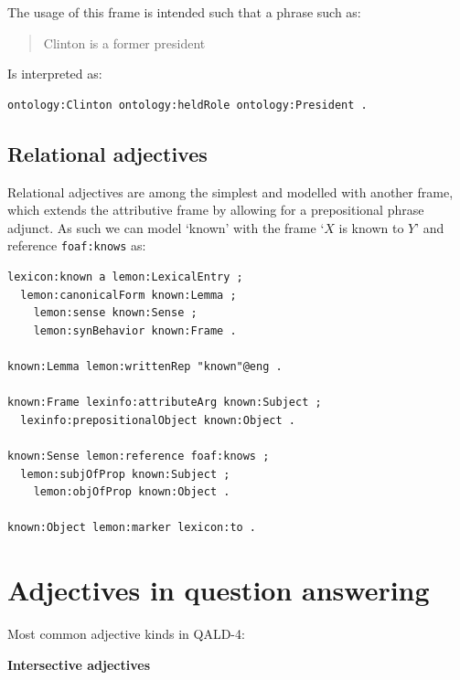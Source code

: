 \documentclass[11pt]{article}
\begin{document}
The usage of this frame is intended such that a phrase such as:

\begin{quote}
Clinton is a former president
\end{quote}

Is interpreted as:

\begin{verbatim}
ontology:Clinton ontology:heldRole ontology:President .
\end{verbatim}

\subsection{Relational adjectives}

Relational adjectives are among the simplest and modelled with another frame,
which extends the attributive frame by allowing for a prepositional phrase
adjunct. As such we can model `known' with the frame `$X$ is known to $Y$' and
reference {\tt foaf:knows} as:

\begin{verbatim}
lexicon:known a lemon:LexicalEntry ;
  lemon:canonicalForm known:Lemma ;
	lemon:sense known:Sense ;
	lemon:synBehavior known:Frame .

known:Lemma lemon:writtenRep "known"@eng .

known:Frame lexinfo:attributeArg known:Subject ;
  lexinfo:prepositionalObject known:Object .

known:Sense lemon:reference foaf:knows ;
  lemon:subjOfProp known:Subject ;
	lemon:objOfProp known:Object .
	
known:Object lemon:marker lexicon:to .
\end{verbatim}


\section{Adjectives in question answering}

Most common adjective kinds in QALD-4:

\textbf{Intersective adjectives}
\end{document}
